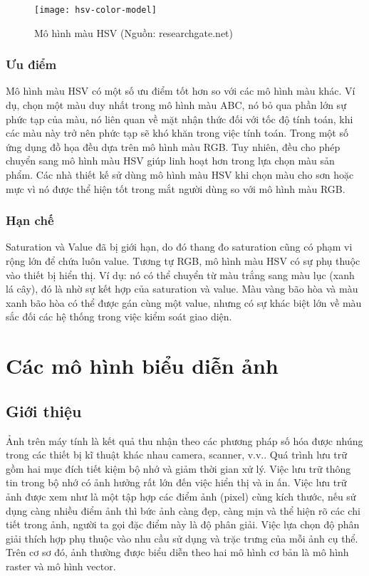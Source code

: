 \begin{figure}[h]
	\centering
	\texttt{[image: hsv-color-model]}
	\caption[Mô hình màu HSV]{Mô hình màu HSV (Nguồn: researchgate.net)}
	\label{fig:2.2}
\end{figure}

\subsubsection{Ưu điểm}
Mô hình màu HSV có một số ưu điểm tốt hơn so với các mô hình màu khác. Ví dụ, chọn một màu duy nhất trong mô hình màu ABC, nó bỏ qua phần lớn sự phức tạp của màu, nó liên quan về mặt nhận thức đối với tốc độ tính toán, khi các màu này trở nên phức tạp sẽ khó khăn trong việc tính toán. Trong một số ứng dụng đồ họa đều dựa trên mô hình màu RGB. Tuy nhiên, đều cho phép chuyển sang mô hình màu HSV giúp linh hoạt hơn trong lựa chọn màu sản phẩm. Các nhà thiết kế sử dùng mô hình màu HSV khi chọn màu cho sơn hoặc mực vì nó được thể hiện tốt trong mắt người dùng so với mô hình màu RGB.\par

\subsubsection{Hạn chế}
Saturation và Value đã bị giới hạn, do đó thang đo saturation cũng có phạm vi rộng lớn để chứa luôn value. Tương tự RGB, mô hình màu HSV có sự phụ thuộc vào thiết bị hiển thị. Ví dụ: nó có thể chuyển từ màu trắng sang màu lục (xanh lá cây), đó là nhờ sự kết hợp của saturation và value. Màu vàng bão hòa và màu xanh bão hòa có thể được gán cùng một value, nhưng có sự khác biệt lớn về màu sắc đối các hệ thống trong việc kiểm soát giao diện.


\section{Các mô hình biểu diễn ảnh}
\subsection{Giới thiệu}
Ảnh trên máy tính là kết quả thu nhận theo các phương pháp số hóa được nhúng trong các thiết bị kĩ thuật khác nhau camera, scanner, v.v.. Quá trình lưu trữ gồm hai mục đích tiết kiệm bộ nhớ và giảm thời gian xử lý. Việc lưu trữ thông tin trong bộ nhớ có ảnh hưởng rất lớn đến việc hiển thị và in ấn. Việc lưu trữ ảnh được xem như là một tập hợp các điểm ảnh (pixel) cùng kích thước, nếu sử dụng càng nhiều điểm ảnh thì bức ảnh càng đẹp, càng mịn và thể hiện rõ các chi tiết trong ảnh, người ta gọi đặc điểm này là độ phân giải. Việc lựa chọn độ phân giải thích hợp phụ thuộc vào nhu cầu sử dụng và trặc trưng của mỗi ảnh cụ thể. Trên cơ sơ đó, ảnh thường được biểu diễn theo hai mô hình cơ bản là mô hình raster và mô hình vector.\par

